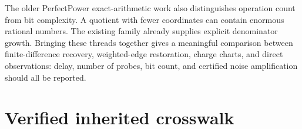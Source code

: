 \documentclass[
  11pt,
  a4paper,
]{report}
\let\nxtexttt\texttt
\renewcommand{\texttt}[1]{\nxtexttt{\seqsplit{#1}}}
\begin{document}
The older PerfectPower exact-arithmetic work also distinguishes
operation count from bit complexity. A quotient with fewer coordinates
can contain enormous rational numbers. The existing \texttt{K\_2,3}
family already supplies explicit denominator growth. Bringing these
threads together gives a meaningful comparison between finite-difference
recovery, weighted-edge restoration, charge charts, and direct
observations: delay, number of probes, bit count, and certified noise
amplification should all be reported.

\hypertarget{verified-inherited-crosswalk-4}{%
\section{Verified inherited
crosswalk}\label{verified-inherited-crosswalk-4}}
\end{document}
